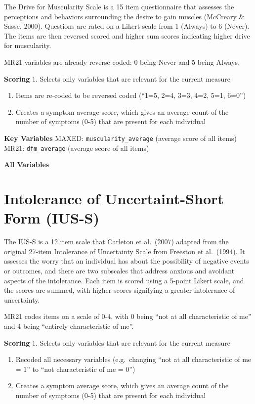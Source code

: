 \documentclass[
]{book}
\begin{document}
The Drive for Muscularity Scale is a 15 item questionnaire that assesses
the perceptions and behaviors surrounding the desire to gain muscles
(McCreary \& Sasse, 2000). Questions are rated on a Likert scale from 1
(Always) to 6 (Never). The items are then reversed scored and higher sum
scores indicating higher drive for muscularity.

MR21 variables are already reverse coded: 0 being Never and 5 being
Always.

\textbf{Scoring} 1. Selects only variables that are relevant for the current
measure

\begin{enumerate}
\def\labelenumi{\arabic{enumi}.}
\setcounter{enumi}{1}
\item
  Items are re-coded to be reversed coded (``1=5, 2=4, 3=3, 4=2, 5=1,
  6=0'')
\item
  Creates a symptom average score, which gives an average count of the
  number of symptoms (0-5) that are present for each individual
\end{enumerate}

\textbf{Key Variables} MAXED: \texttt{muscularity\_average} (average score of all
items) MR21: \texttt{dfm\_average} (average score of all items)

\textbf{All Variables}

\section{Intolerance of Uncertaint-Short Form (IUS-S)}\label{intolerance-of-uncertaint-short-form-ius-s}

The IUS-S is a 12 item scale that Carleton et al.~(2007) adapted from
the original 27-item Intolerance of Uncertainty Scale from Freeston et
al.~(1994). It assesses the worry that an individual has about the
possibility of negative events or outcomes, and there are two subscales
that address anxious and avoidant aspects of the intolerance. Each item
is scored using a 5-point Likert scale, and the scores are summed, with
higher scores signifying a greater intolerance of uncertainty.

MR21 codes items on a scale of 0-4, with 0 being ``not at all
characteristic of me'' and 4 being ``entirely characteristic of me''.

\textbf{Scoring} 1. Selects only variables that are relevant for the current
measure

\begin{enumerate}
\def\labelenumi{\arabic{enumi}.}
\setcounter{enumi}{1}
\item
  Recoded all necessary variables (e.g.~changing ``not at all
  characteristic of me = 1'' to ``not characteristic of me = 0'')
\item
  Creates a symptom average score, which gives an average count of the
  number of symptoms (0-5) that are present for each individual
\end{enumerate}
\end{document}
